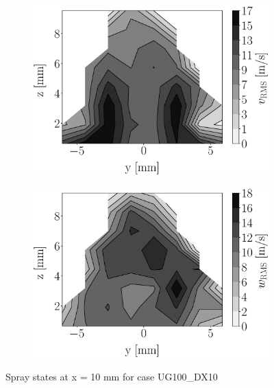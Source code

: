 \begin{figure}[h!]
\begin{subfigure}[b]{0.22\textwidth}
	\centering
   \includegraphics[scale=0.17]{./part2_developments/figures_ch5_resolved_JICF/injectors_SLI/uG100_dx10_x10_uy_rms_map.eps}
\end{subfigure}
   \hspace{0.17in}
\begin{subfigure}[b]{0.22\textwidth}
	\centering
   \includegraphics[scale=0.17]{./part2_developments/figures_ch5_resolved_JICF/injectors_SLI/uG100_dx10_x10_uz_rms_map.eps}
\end{subfigure}
\caption{Spray states at x = 10 mm for case UG100\_DX10}
\label{fig:injectors_sli_uG100_dx10_x10}
\end{figure}



